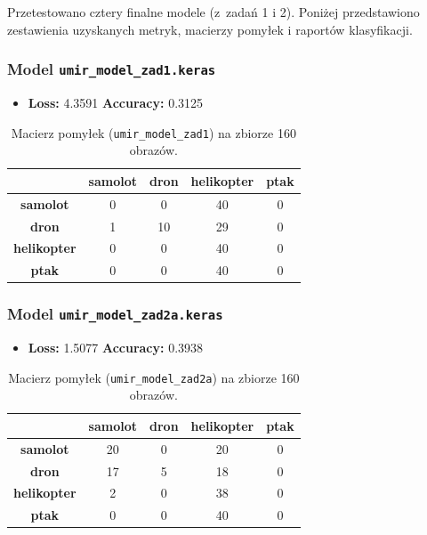 Przetestowano cztery finalne modele (z~zadań 1 i 2). Poniżej przedstawiono zestawienia uzyskanych metryk, macierzy pomyłek i raportów klasyfikacji.

\subsubsection*{Model \texttt{umir\_model\_zad1.keras}}
\begin{itemize}
    \item \textbf{Loss:} 4.3591 \quad \textbf{Accuracy:} 0.3125 \quad
\end{itemize}

\begin{table}[H]
\centering
\caption{Macierz pomyłek (\texttt{umir\_model\_zad1}) na zbiorze 160 obrazów.}
\begin{tabular}{c|cccc}
\hline
 & \textbf{samolot} & \textbf{dron} & \textbf{helikopter} & \textbf{ptak} \\ 
\hline
\textbf{samolot}     & 0 & 0 & 40 & 0 \\
\textbf{dron}        & 1 & 10 & 29 & 0 \\
\textbf{helikopter}  & 0 & 0 & 40 & 0 \\
\textbf{ptak}        & 0 & 0 & 40 & 0 \\
\hline
\end{tabular}
\end{table}

\noindent


\subsubsection*{Model \texttt{umir\_model\_zad2a.keras}}
\begin{itemize}
    \item \textbf{Loss:} 1.5077 \quad \textbf{Accuracy:} 0.3938 \quad
\end{itemize}

\begin{table}[H]
\centering
\caption{Macierz pomyłek (\texttt{umir\_model\_zad2a}) na zbiorze 160 obrazów.}
\begin{tabular}{c|cccc}
\hline
 & \textbf{samolot} & \textbf{dron} & \textbf{helikopter} & \textbf{ptak}\\
\hline
\textbf{samolot}     & 20 &  0 & 20 &  0 \\
\textbf{dron}        & 17 &  5 & 18 &  0 \\
\textbf{helikopter}  &  2 &  0 & 38 &  0 \\
\textbf{ptak}        &  0 &  0 & 40 &  0 \\
\hline
\end{tabular}
\end{table}

